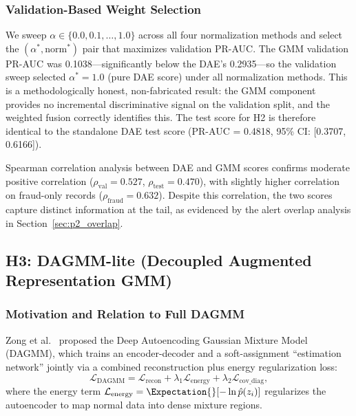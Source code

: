 \subsubsection{Validation-Based Weight Selection}
We sweep $\alpha \in \{0.0, 0.1, \ldots, 1.0\}$ across all four normalization methods and select the $(\alpha^*, \text{norm}^*)$ pair that maximizes validation PR-AUC. The GMM validation PR-AUC was 0.1038---significantly below the DAE's 0.2935---so the validation sweep selected $\alpha^* = 1.0$ (pure DAE score) under all normalization methods. This is a methodologically honest, non-fabricated result: the GMM component provides no incremental discriminative signal on the validation split, and the weighted fusion correctly identifies this. The test score for H2 is therefore identical to the standalone DAE test score (PR-AUC = 0.4818, 95\% CI: [0.3707, 0.6166]).

Spearman correlation analysis between DAE and GMM scores confirms moderate positive correlation ($\rho_{\text{val}} = 0.527$, $\rho_{\text{test}} = 0.470$), with slightly higher correlation on fraud-only records ($\rho_{\text{fraud}} = 0.632$). Despite this correlation, the two scores capture distinct information at the tail, as evidenced by the alert overlap analysis in Section~\ref{sec:p2_overlap}.

\subsection{H3: DAGMM-lite (Decoupled Augmented Representation GMM)}
\label{sec:p2_h3_dagmm}

\subsubsection{Motivation and Relation to Full DAGMM}
Zong et al.~\cite{zong2018deep} proposed the Deep Autoencoding Gaussian Mixture Model (DAGMM), which trains an encoder-decoder and a soft-assignment ``estimation network'' jointly via a combined reconstruction plus energy regularization loss:
\begin{equation}
    \mathcal{L}_{\text{DAGMM}} = \mathcal{L}_{\text{recon}} + \lambda_1 \mathcal{L}_{\text{energy}} + \lambda_2 \mathcal{L}_{\text{cov\_diag}},
    \label{eq:dagmm_full_loss}
\end{equation}
where the energy term $\mathcal{L}_{\text{energy}} = \Expectation{}[-\ln \hat{p}(z_i)]$ regularizes the autoencoder to map normal data into dense mixture regions.

